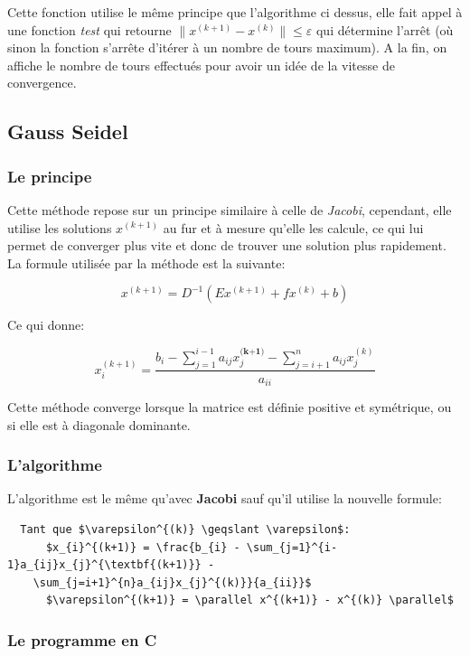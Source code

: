 \documentclass[a4paper]{article}
\begin{document}
Cette fonction utilise le même principe que l'algorithme ci dessus, elle
fait appel à une fonction \textit{test} qui retourne $\parallel x^{(k+1)} -
x^{(k)} \parallel \leqslant \varepsilon$ qui détermine l'arrêt (où sinon la
fonction s'arrête d'itérer à un nombre de tours maximum). A la fin, on affiche
le nombre de tours effectués pour avoir un idée de la vitesse de convergence.

\subsection{Gauss Seidel}

\subsubsection{Le principe}

Cette méthode repose sur un principe similaire à celle de \textit{Jacobi},
cependant, elle utilise les solutions $x^{(k+1)}$ au fur et à mesure qu'elle
les calcule, ce qui lui permet de converger plus vite et donc de trouver une
solution plus rapidement. La formule utilisée par la méthode est la suivante:

\[x^{(k+1)} = D^{-1}(Ex^{(k+1)} + fx^{(k)} + b)\]

Ce qui donne:

\[x_{i}^{(k+1)} = \frac{b_{i} - \sum_{j=1}^{i-1}a_{ij}x_{j}^{\textbf{(k+1)}} -
  \sum_{j=i+1}^{n}a_{ij}x_{j}^{(k)}}{a_{ii}}\]

Cette méthode converge lorsque la matrice est définie positive et symétrique, ou
si elle est à diagonale dominante.

\subsubsection{L'algorithme}

L'algorithme est le même qu'avec \textbf{Jacobi} sauf qu'il utilise la nouvelle formule:

\begin{lstlisting}
  Tant que $\varepsilon^{(k)} \geqslant \varepsilon$:
      $x_{i}^{(k+1)} = \frac{b_{i} - \sum_{j=1}^{i-1}a_{ij}x_{j}^{\textbf{(k+1)}} -
    \sum_{j=i+1}^{n}a_{ij}x_{j}^{(k)}}{a_{ii}}$
      $\varepsilon^{(k+1)} = \parallel x^{(k+1)} - x^{(k)} \parallel$
\end{lstlisting}

\subsubsection{Le programme en C}
\end{document}
